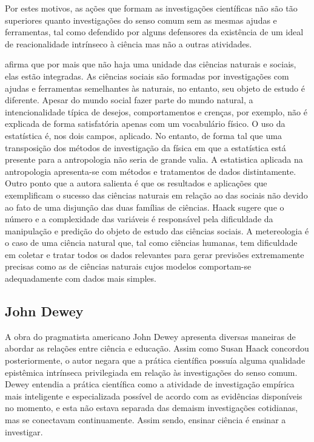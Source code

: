 \documentclass[12pt]{report}
\begin{document}
		Por estes motivos, as ações que formam as investigações científicas não são tão superiores quanto investigações do senso comum sem as mesmas ajudas e ferramentas, tal como defendido por alguns defensores da existência de um ideal de reacionalidade intrínseco à ciência mas não a outras atividades.

		\textcite{haack-defending-science} afirma que por mais que não haja uma unidade das ciências naturais e sociais, elas estão integradas. As ciências sociais são formadas por investigações com ajudas e ferramentas semelhantes às naturais, no entanto, seu objeto de estudo é diferente. Apesar do mundo social fazer parte do mundo natural, a intencionalidade típica de desejos, comportamentos e crenças, por exemplo, não é explicada de forma satisfatória apenas com um vocabulário físico. O uso da estatística é, nos dois campos, aplicado. No entanto, de forma tal que uma transposição dos métodos de investigação da física em que a estatística está presente para a antropologia não seria de grande valia. A estatistica aplicada na antropologia apresenta-se com métodos e tratamentos de dados distintamente. Outro ponto que a autora salienta é que os resultados e aplicações que exemplificam o sucesso das ciências naturais em relação ao das sociais não devido ao fato de uma disjunção das duas famílias de ciências. Haack sugere que o número e a complexidade das variáveis é responsável pela dificuldade da manipulação e predição do objeto de estudo das ciências sociais. A metereologia é o caso de uma ciência natural que, tal como ciências humanas, tem dificuldade em coletar e tratar todos os dados relevantes para gerar previsões extremamente precisas como as de ciências naturais cujos modelos comportam-se adequadamente com dados mais simples.
	
	
	\subsection{John Dewey}
	
		A obra do pragmatista americano John Dewey apresenta diversas maneiras de abordar as relações entre ciência e educação. Assim como Susan Haack concordou posteriormente, o autor negara que a prática científica possuía alguma qualidade epistêmica intrínseca privilegiada em relação às investigações do senso comum. Dewey entendia a prática científica como a atividade de investigação empírica mais inteligente e especializada possível de acordo com as evidências disponíveis no momento, e esta não estava separada das demaism investigações cotidianas, mas se conectavam continuamente. Assim sendo, ensinar ciência é ensinar a investigar.
		
\end{document}
